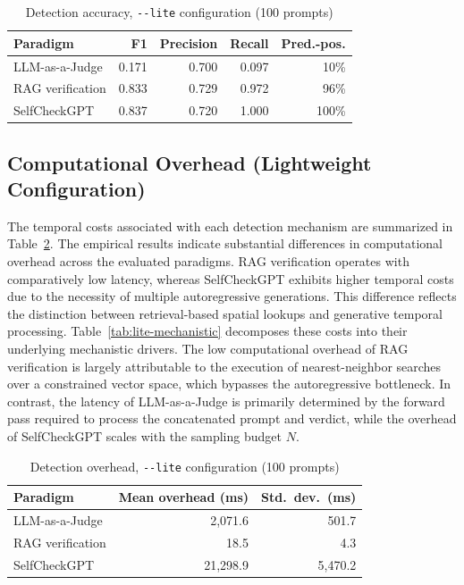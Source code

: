 \documentclass[conference]{IEEEtran}
\begin{document}
\begin{table}[!htbp]
\caption{Detection accuracy, \texttt{-{}-lite} configuration (100 prompts)}
\label{tab:lite-accuracy}
\centering
\small
\begin{tabular}{@{}lrrrr@{}}
\toprule
Paradigm & F1 & Precision & Recall & Pred.-pos. \\
\midrule
LLM-as-a-Judge   & 0.171 & 0.700 & 0.097 & 10\%  \\
RAG verification & 0.833 & 0.729 & 0.972 & 96\%  \\
SelfCheckGPT     & 0.837 & 0.720 & 1.000 & 100\% \\
\bottomrule
\end{tabular}
\end{table}

\FloatBarrier
\subsection{Computational Overhead (Lightweight Configuration)}

The temporal costs associated with each detection mechanism are summarized in Table~\ref{tab:lite-overhead}. The empirical results indicate substantial differences in computational overhead across the evaluated paradigms. RAG verification operates with comparatively low latency, whereas SelfCheckGPT exhibits higher temporal costs due to the necessity of multiple autoregressive generations. This difference reflects the distinction between retrieval-based spatial lookups and generative temporal processing. Table~\ref{tab:lite-mechanistic} decomposes these costs into their underlying mechanistic drivers. The low computational overhead of RAG verification is largely attributable to the execution of nearest-neighbor searches over a constrained vector space, which bypasses the autoregressive bottleneck. In contrast, the latency of LLM-as-a-Judge is primarily determined by the forward pass required to process the concatenated prompt and verdict, while the overhead of SelfCheckGPT scales with the sampling budget $N$. 

\begin{table}[!htbp]
\caption{Detection overhead, \texttt{-{}-lite} configuration (100 prompts)}
\label{tab:lite-overhead}
\centering
\small
\begin{tabular}{@{}lrr@{}}
\toprule
Paradigm & Mean overhead (ms) & Std.\ dev.\ (ms) \\
\midrule
LLM-as-a-Judge   & 2{,}071.6  & 501.7   \\
RAG verification & 18.5       & 4.3     \\
SelfCheckGPT     & 21{,}298.9 & 5{,}470.2 \\
\bottomrule
\end{tabular}
\end{table}
\end{document}
